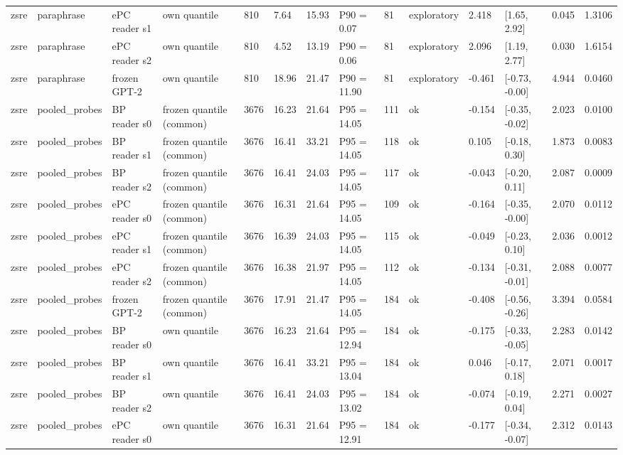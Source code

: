 \documentclass[10pt,a4paper]{article}
\begin{document}
\begin{center}
\begin{tabularx}{\textwidth}{@{}p{}XXXXXXXXXXXXX@{}}
zsre & paraphrase & ePC reader s1 & own quantile & 810 & 7.64 & 15.93 & P90 = 0.07 & 81 & exploratory & 2.418 & [1.65, 2.92] & 0.045 & 1.3106 \\
zsre & paraphrase & ePC reader s2 & own quantile & 810 & 4.52 & 13.19 & P90 = 0.06 & 81 & exploratory & 2.096 & [1.19, 2.77] & 0.030 & 1.6154 \\
zsre & paraphrase & frozen GPT-2 & own quantile & 810 & 18.96 & 21.47 & P90 = 11.90 & 81 & exploratory & -0.461 & [-0.73, -0.00] & 4.944 & 0.0460 \\
zsre & pooled\_probes & BP reader s0 & frozen quantile (common) & 3676 & 16.23 & 21.64 & P95 = 14.05 & 111 & ok & -0.154 & [-0.35, -0.02] & 2.023 & 0.0100 \\
zsre & pooled\_probes & BP reader s1 & frozen quantile (common) & 3676 & 16.41 & 33.21 & P95 = 14.05 & 118 & ok & 0.105 & [-0.18, 0.30] & 1.873 & 0.0083 \\
zsre & pooled\_probes & BP reader s2 & frozen quantile (common) & 3676 & 16.41 & 24.03 & P95 = 14.05 & 117 & ok & -0.043 & [-0.20, 0.11] & 2.087 & 0.0009 \\
zsre & pooled\_probes & ePC reader s0 & frozen quantile (common) & 3676 & 16.31 & 21.64 & P95 = 14.05 & 109 & ok & -0.164 & [-0.35, -0.00] & 2.070 & 0.0112 \\
zsre & pooled\_probes & ePC reader s1 & frozen quantile (common) & 3676 & 16.39 & 24.03 & P95 = 14.05 & 115 & ok & -0.049 & [-0.23, 0.10] & 2.036 & 0.0012 \\
zsre & pooled\_probes & ePC reader s2 & frozen quantile (common) & 3676 & 16.38 & 21.97 & P95 = 14.05 & 112 & ok & -0.134 & [-0.31, -0.01] & 2.088 & 0.0077 \\
zsre & pooled\_probes & frozen GPT-2 & frozen quantile (common) & 3676 & 17.91 & 21.47 & P95 = 14.05 & 184 & ok & -0.408 & [-0.56, -0.26] & 3.394 & 0.0584 \\
zsre & pooled\_probes & BP reader s0 & own quantile & 3676 & 16.23 & 21.64 & P95 = 12.94 & 184 & ok & -0.175 & [-0.33, -0.05] & 2.283 & 0.0142 \\
zsre & pooled\_probes & BP reader s1 & own quantile & 3676 & 16.41 & 33.21 & P95 = 13.04 & 184 & ok & 0.046 & [-0.17, 0.18] & 2.071 & 0.0017 \\
zsre & pooled\_probes & BP reader s2 & own quantile & 3676 & 16.41 & 24.03 & P95 = 13.02 & 184 & ok & -0.074 & [-0.19, 0.04] & 2.271 & 0.0027 \\
zsre & pooled\_probes & ePC reader s0 & own quantile & 3676 & 16.31 & 21.64 & P95 = 12.91 & 184 & ok & -0.177 & [-0.34, -0.07] & 2.312 & 0.0143 \\

\end{tabularx}
\end{center}
\end{document}
